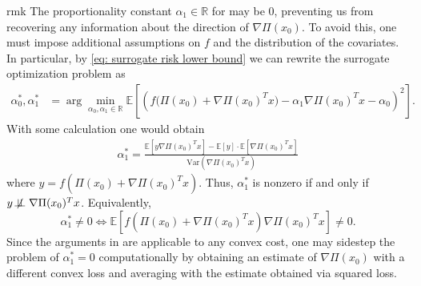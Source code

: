 \documentclass[11pt]{article}
\begin{document}




\begin{restatable}{rmk}{}
    The proportionality constant $\alpha_1 \in \mathbb{R}$ for  may be $0$, preventing us from recovering any information about the direction of $\nabla\Pi(x_0)$. To avoid this, one must impose additional assumptions on $f$ and the distribution of the covariates. In particular, by \cref{eq: surrogate risk lower bound} we can rewrite the surrogate optimization problem as
    \begin{align}
        \alpha_0^*, \alpha_1^* &= \arg\min_{\alpha_0, \alpha_1 \in \mathbb{R}} \mathbb{E}\left[\left(f\Big(\Pi(x_0) + \nabla\Pi(x_0)^{T}x\Big) - \alpha_1 \nabla\Pi(x_0)^Tx - \alpha_0 \right)^2\right].
    \end{align}
    With some calculation one would obtain
    \begin{align}
        \alpha_1^* = \frac{\mathbb{E}\left[y\nabla\Pi(x_0)^Tx\right] - \mathbb{E}[y]\cdot \mathbb{E}\left[\nabla\Pi(x_0)^Tx\right]}{\text{Var}(\nabla\Pi(x_0)^Tx)}
    \end{align}
    where $y = f\left(\Pi(x_0) + \nabla\Pi(x_0)^Tx\right)$. Thus, $
    \alpha_1^*$ is nonzero if and only if $y \not\!\perp\!\!\!\perp \nabla\Pi(x_0)^Tx$. Equivalently, 
    \[\alpha_1^* \neq 0 \iff \mathbb{E}\left[f\left(\Pi(x_0) + \nabla\Pi(x_0)^Tx\right)\nabla\Pi(x_0)^Tx\right] \neq 0.\]
    Since the arguments in  are applicable to any convex cost, one may sidestep the problem of $\alpha^*_1 = 0$ computationally by obtaining an estimate of $\nabla\Pi(x_0)$ with a different convex loss and averaging with the estimate obtained via squared loss.
    
    
\end{restatable}
\end{document}
